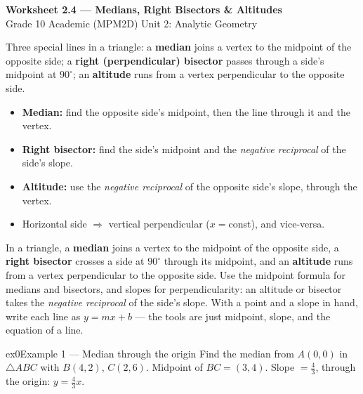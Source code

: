 \documentclass[11pt]{article}
\begin{document}
\begin{center}
{\LARGE\bfseries\color{titleblue}Worksheet 2.4 --- Medians, Right Bisectors \& Altitudes}\\[2pt]
{\small Grade 10 Academic (MPM2D) \textperiodcentered{} Unit 2: Analytic Geometry}
\end{center}

\begin{ideabox}
Three special lines in a triangle: a \textbf{median} joins a vertex to the midpoint of the opposite side; a \textbf{right (perpendicular) bisector} passes through a side's midpoint at $90^\circ$; an \textbf{altitude} runs from a vertex perpendicular to the opposite side.
\begin{itemize}[leftmargin=*,itemsep=2pt]
  \item \textbf{Median:} find the opposite side's midpoint, then the line through it and the vertex.
  \item \textbf{Right bisector:} find the side's midpoint and the \emph{negative reciprocal} of the side's slope.
  \item \textbf{Altitude:} use the \emph{negative reciprocal} of the opposite side's slope, through the vertex.
  \item Horizontal side $\Rightarrow$ vertical perpendicular ($x=$const), and vice-versa.
\end{itemize}
\end{ideabox}

\begin{learnbox}
In a triangle, a \textbf{median} joins a vertex to the midpoint of the opposite side, a \textbf{right bisector} crosses a side at $90^\circ$ through its midpoint, and an \textbf{altitude} runs from a vertex perpendicular to the opposite side.
Use the midpoint formula for medians and bisectors, and slopes for perpendicularity: an altitude or bisector takes the \emph{negative reciprocal} of the side's slope.
With a point and a slope in hand, write each line as $y=mx+b$ — the tools are just midpoint, slope, and the equation of a line.
\end{learnbox}


\begin{example}{ex0}{Example 1 --- Median through the origin}
Find the median from $A(0,0)$ in $\triangle ABC$ with $B(4,2)$, $C(2,6)$.
\soln Midpoint of $BC=(3,4)$. Slope $=\tfrac{4}{3}$, through the origin: $y=\tfrac43x.$
\end{example}
\end{document}
